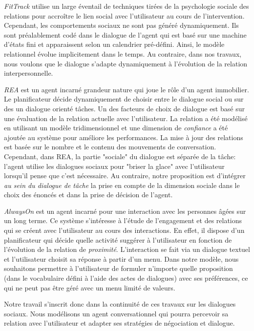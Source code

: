 \documentclass [french]{sig-alternate-05-2015}
\begin{document}
\textit{FitTrack} \cite{bickmore2005s} utilise un large éventail de techniques tirées de la psychologie sociale des relations pour accroître le lien social avec l'utilisateur au cours de l'intervention. Cependant, les comportements sociaux ne sont pas généré dynamiquement. Ils sont préalablement codé dans le dialogue de l'agent qui est basé sur une machine d'états fini et apparaissent selon un calendrier pré-défini. Ainsi, le modèle relationnel évolue implicitement dans le temps. Au contraire, dans nos travaux, nous voulons que le dialogue s'adapte dynamiquement à l'évolution de la relation interpersonnelle.

\textit{REA} \cite{bickmore2005establishing} est un agent incarné grandeur nature qui joue le rôle d'un agent immobilier. Le planificateur décide dynamiquement de choisir entre le dialogue social ou sur des un dialogue orienté tâches. Un des facteurs de choix de dialogue est basé sur une évaluation de la relation actuelle avec l'utilisateur. La relation a été modélisé en utilisant un modèle tridimensionnel \cite{svennevig2000getting} et une dimension de \textit{confiance} a été ajoutée au système pour améliore les performances. La mise à jour des relations est basée sur le nombre et le contenu des mouvements de conversation. Cependant, dans REA, la partie "sociale" du dialogue est séparée de la tâche: l'agent utilise les dialogues sociaux pour "briser la glace" avec l'utilisateur lorsqu'il pense que c'est nécessaire. Au contraire, notre proposition est d'intégrer \textit{au sein du dialogue de tâche} la prise en compte de la dimension sociale dans le choix des énoncés et dans la prise de décision de l'agent.

\textit{AlwaysOn} \cite{sidner2013always} est un agent incarné pour une interaction avec les personnes âgées sur un long terme. Ce système s'intéresse à l'étude de l'engagement et des relations qui se créent avec l'utilisateur au cours des interactions. En effet, il dispose d'un planificateur qui décide quelle activité suggérer à l'utilisateur en fonction de l'évolution de la relation de \textit{proximité}. L'interaction se fait via un dialogue textuel et l'utilisateur choisit sa réponse à partir d'un menu. Dans notre modèle, nous souhaitons permettre à l'utilisateur de formuler n'importe quelle proposition (dans le vocabulaire défini à l'aide des actes de dialogues) avec ses préférences, ce qui ne peut pas être géré avec un menu limité de valeurs.

Notre travail s'inscrit donc dans la continuité de ces travaux sur les dialogues sociaux. Nous modélisons un agent conversationnel qui pourra percevoir sa relation avec l'utilisateur et adapter ses stratégies de négociation et dialogue.
\end{document}
